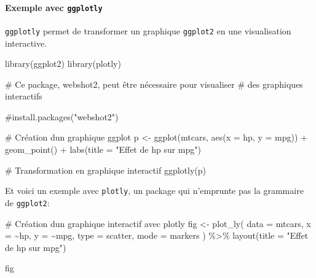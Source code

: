 \documentclass[
  letterpaper,
  DIV=11,
  numbers=noendperiod,
  oneside]{scrreprt}
\let\oldparagraph\paragraph
\renewcommand{\paragraph}[1]{\oldparagraph{#1}\mbox{}}
\newenvironment{Shaded}{\begin{snugshade}}{\end{snugshade}}
\newcommand{\AttributeTok}[1]{\textcolor[rgb]{0.40,0.45,0.13}{#1}}
\newcommand{\CommentTok}[1]{\textcolor[rgb]{0.37,0.37,0.37}{#1}}
\newcommand{\FunctionTok}[1]{\textcolor[rgb]{0.28,0.35,0.67}{#1}}
\newcommand{\NormalTok}[1]{\textcolor[rgb]{0.00,0.23,0.31}{#1}}
\newcommand{\OtherTok}[1]{\textcolor[rgb]{0.00,0.23,0.31}{#1}}
\newcommand{\SpecialCharTok}[1]{\textcolor[rgb]{0.37,0.37,0.37}{#1}}
\newcommand{\StringTok}[1]{\textcolor[rgb]{0.13,0.47,0.30}{#1}}
\begin{document}
\hypertarget{exemple-avec-ggplotly}{%
\paragraph{\texorpdfstring{Exemple avec
\texttt{ggplotly}}{Exemple avec ggplotly}}\label{exemple-avec-ggplotly}}

\texttt{ggplotly} permet de transformer un graphique \texttt{ggplot2} en
une visualisation interactive.

\begin{Shaded}
\begin{Highlighting}[]
\FunctionTok{library}\NormalTok{(ggplot2)}
\FunctionTok{library}\NormalTok{(plotly)}
\end{Highlighting}
\end{Shaded}

\begin{Shaded}
\begin{Highlighting}[]
\CommentTok{\# Ce package, webshot2, peut être nécessaire pour visualiser}
\CommentTok{\#  des graphiques interactifs}

\CommentTok{\#install.packages("webshot2")}

\CommentTok{\# Création d\textquotesingle{}un graphique ggplot}
\NormalTok{p }\OtherTok{\textless{}{-}} \FunctionTok{ggplot}\NormalTok{(mtcars, }\FunctionTok{aes}\NormalTok{(}\AttributeTok{x =}\NormalTok{ hp, }\AttributeTok{y =}\NormalTok{ mpg)) }\SpecialCharTok{+}
  \FunctionTok{geom\_point}\NormalTok{() }\SpecialCharTok{+}
  \FunctionTok{labs}\NormalTok{(}\AttributeTok{title =} \StringTok{"Effet de hp sur mpg"}\NormalTok{)}

\CommentTok{\# Transformation en graphique interactif}
\FunctionTok{ggplotly}\NormalTok{(p)}
\end{Highlighting}
\end{Shaded}

Et voici un exemple avec \texttt{plotly}, un package qui n'emprunte pas
la grammaire de \texttt{ggplot2}:

\begin{Shaded}
\begin{Highlighting}[]
\CommentTok{\# Création d\textquotesingle{}un graphique interactif avec plotly}
\NormalTok{fig }\OtherTok{\textless{}{-}} \FunctionTok{plot\_ly}\NormalTok{(}
  \AttributeTok{data =}\NormalTok{ mtcars,}
  \AttributeTok{x =} \SpecialCharTok{\textasciitilde{}}\NormalTok{hp, }\AttributeTok{y =} \SpecialCharTok{\textasciitilde{}}\NormalTok{mpg,}
  \AttributeTok{type =} \StringTok{\textquotesingle{}scatter\textquotesingle{}}\NormalTok{,}
  \AttributeTok{mode =} \StringTok{\textquotesingle{}markers\textquotesingle{}}
\NormalTok{  ) }\SpecialCharTok{\%\textgreater{}\%}
  \FunctionTok{layout}\NormalTok{(}\AttributeTok{title =} \StringTok{"Effet de hp sur mpg"}\NormalTok{)}

\NormalTok{fig}
\end{Highlighting}
\end{Shaded}
\end{document}
